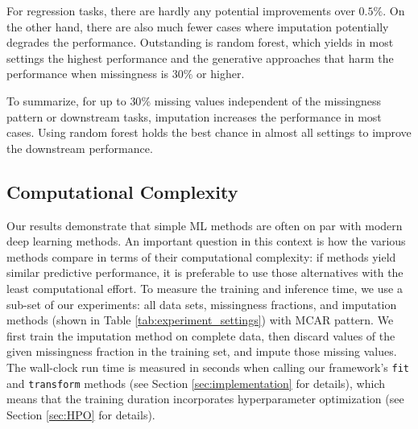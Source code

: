 \documentclass[utf8]{frontiersSCNS} %
\newcommand{\code}[1]{\texttt{#1}}
\begin{document}
For regression tasks, there are hardly any potential improvements over $0.5\%$. On the other hand, there are also much fewer cases where imputation potentially degrades the performance. Outstanding is random forest, which yields in most settings the highest performance and the generative approaches that harm the performance when missingness is $30\%$ or higher.

To summarize, for up to $30\%$ missing values independent of the missingness pattern or downstream tasks, imputation increases the performance in most cases. Using random forest holds the best chance in almost all settings to improve the downstream performance.


\subsection{Computational Complexity}
%
Our results demonstrate that simple ML methods are often on par with modern deep learning methods. An important question in this context is how the various methods compare in terms of their computational complexity: if methods yield similar predictive performance, it is preferable to use those alternatives with the least computational effort. To measure the training and inference time, we use a sub-set of our experiments: all data sets, missingness fractions, and imputation methods (shown in Table \ref{tab:experiment_settings}) with MCAR pattern. We first train the imputation method on complete data, then discard values of the given missingness fraction in the training set, and impute those missing values. The wall-clock run time is measured in seconds when calling our framework's \code{fit} and \code{transform} methods (see Section \ref{sec:implementation} for details), which means that the training duration incorporates hyperparameter optimization (see Section \ref{sec:HPO} for details).
\end{document}
